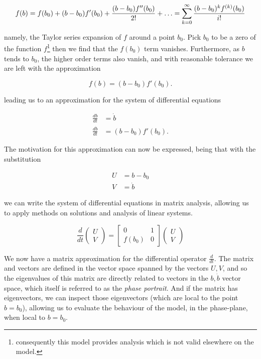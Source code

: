 \documentclass{article}
\begin{document}
\begin{equation*}
    f(b) = f(b_0) + (b-b_0)f'(b_0) + \frac{(b-b_0)f''(b_0)}{2!} + \mathellipsis = \sum_{k=0}^\infty\frac{(b-b_0)^{k}f^{(k)}(b_0)}{i!}
\end{equation*}

namely, the Taylor series expansion of $f$ around a point $b_0$.
Pick $b_0$ to be a zero of the function $f$\footnote{consequently this model provides analysis which is not valid elsewhere on the model.}
then we find that the $f(b_0)$ term vanishes.
Furthermore, as $b$ tends to $b_0$, the higher order terms also vanish,
and with reasonable tolerance we are left with the approximation

\begin{equation}
    f(b) = (b-b_0)f'(b_0).
\end{equation}

leading us to an approximation for the system of differential equations

\begin{align}
    \frac{db}{dt} &= \dot{b} \\
    \frac{d\dot{b}}{dt} &= (b-b_0)f'(b_0).
\end{align}

The motivation for this approximation can now be expressed,
being that with the substitution

\begin{align}
    U &= b - b_0 \\
    V &= \dot{b}
\end{align}

we can write the system of differential equations in matrix analysis,
allowing us to apply methods on solutions and analysis of linear systems.

\begin{equation}
    \frac{d}{dt}\begin{pmatrix}
        U \\
        V
    \end{pmatrix} = \begin{bmatrix}
        0 & 1 \\
        f(b_0) & 0
    \end{bmatrix} \begin{pmatrix}
        U \\
        V
    \end{pmatrix}
    \label{eqn:matrix}
\end{equation}

We now have a matrix approximation for the differential operator $\frac{d}{dt}$.
The matrix and vectors are defined in the vector space spanned by the vectors $U,V$,
and so the eigenvalues of this matrix are directly related to vectors in the $b,\dot{b}$ vector space,
which itself is referred to as the \textit{phase portrait}.
And if the matrix has eigenvectors, we can inspect those eigenvectors (which are local to the point $b=b_0$),
allowing us to evaluate the behaviour of the model, in the phase-plane,
when local to $b=b_0$.
\end{document}
